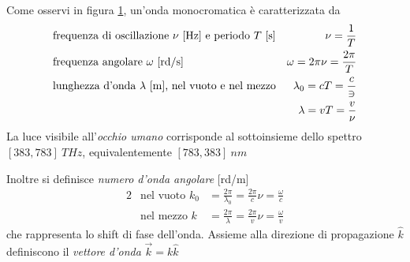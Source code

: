 \begin{figure}[t]
	\label{chapter1:spectrum}
\end{figure}
%
Come osservi in figura \ref{chapter1:spectrum}, un'onda monocromatica \`e caratterizzata da
\begin{alignat}{2}
	&\text{frequenza di oscillazione $\nu$ [\si{Hz}] e periodo $T$ [\si{s}]} & \nu = \frac{1}{T} \\
	&\text{frequenza angolare $\omega$ [\si{rd/s}]} & \omega = 2\pi\nu = \frac{2\pi}{T} \\
	&\text{lunghezza d'onda $\lambda$ [\si{m}], nel vuoto e nel mezzo} & \lambda_0 = cT = \frac{c}{\ni} \\
	& & \lambda = vT = \frac{v}{\nu}
\end{alignat}
La luce visibile all'\textit{occhio umano} corrisponde al sottoinsieme dello spettro $[383, 783]\ \si{THz}$, equivalentemente $[783, 383]\ \si{nm}$\par
Inoltre si definisce \textit{numero d'onda angolare} [\si{rd/m}]
\begin{alignat}{2}
	& \text{nel vuoto } k_0 &= \frac{2\pi}{\lambda_0} = \frac{2\pi}{c}\nu = \frac{\omega}{c} \\
	& \text{nel mezzo }  k &= \frac{2\pi}{\lambda} = \frac{2\pi}{v}\nu = \frac{\omega}{v}
\end{alignat}
che rappresenta lo shift di fase dell'onda. 
Assieme alla direzione di propagazione $\hat{k}$ definiscono il \textit{vettore d'onda} $\overrightarrow{k} = k \hat{k}$\par
